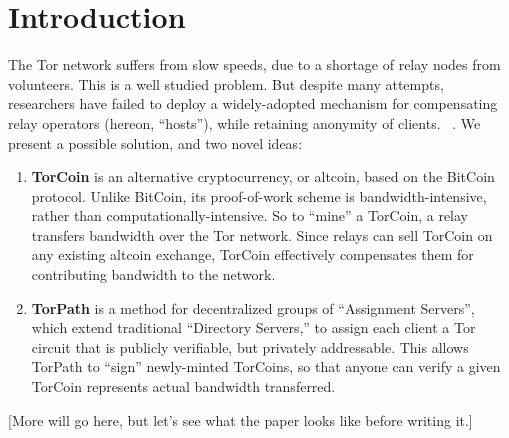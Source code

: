 \section{Introduction}

The Tor network suffers from slow speeds, due to a shortage of relay nodes from volunteers. This is a well studied problem. But despite many attempts, researchers have failed to deploy a widely-adopted mechanism for compensating relay operators (hereon, ``hosts''), while retaining anonymity of clients. ~\cite{raykova-pet2008, wpes09-xpay, incentives-fc10,
ccs10-braids, acsac11-tortoise, jansen2013lira, johnson2013onions}. We present a possible solution, and two novel ideas:

\begin{enumerate}
\item \textbf{TorCoin} is an alternative cryptocurrency, or altcoin, based on the BitCoin protocol. Unlike BitCoin, its proof-of-work scheme is bandwidth-intensive, rather than computationally-intensive. So to ``mine'' a TorCoin, a relay transfers bandwidth over the Tor network. Since relays can sell TorCoin on any existing altcoin exchange, TorCoin effectively compensates them for contributing bandwidth to the network.

\item \textbf{TorPath} is a method for decentralized groups of ``Assignment Servers'', which extend traditional ``Directory Servers,'' to assign each client a Tor circuit that is publicly verifiable, but privately addressable. This allows TorPath to ``sign'' newly-minted TorCoins, so that anyone can verify a given TorCoin represents actual bandwidth transferred. 
\end{enumerate}

[More will go here, but let's see what the paper looks like before writing it.]